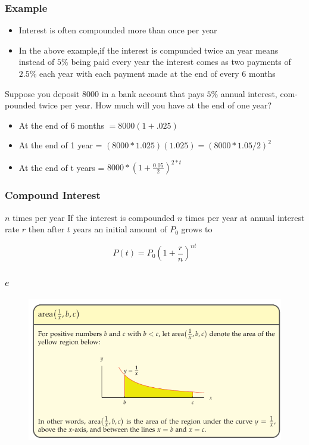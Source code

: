 \documentclass{beamer}
\begin{document}
    \begin{frame}
      \frametitle{Example}
\begin{itemize}
  \item Interest is often compounded more than once per year 
  \item In the above example,if the interest is compunded twice an year means instead of \(5\%\) being paid every year the interest comes as two payments of \(2.5\%\) each year with each payment made at the end of every 6 months
\end{itemize}
Suppose you deposit \(8000\) in a bank account that pays \(5\%\) annual interest, com-
pounded twice per year. How much will you have at the end of one year?

\pause 

\begin{itemize}
  \item At the end of 6 months \(= 8000(1+.025) \) 
  \item At the end of 1 year = \( (8000*1.025)(1.025) = (8000*1.05/2)^2 \)
  \item At the end of t years = \(8000*(1+\frac{0.05}{2})^{2*t} \)
\end{itemize}
\end{frame}
\begin{frame}
  \frametitle{Compound Interest}
  \begin{block}{\(n\) times per year}
    If the interest is compounded \(n\) times per year at annual interest rate
    \(r\) then after \(t\) years an initial amount of \(P_{0}\) grows to 

    \[P(t) = P_{0}(1+\frac{r}{n})^{nt}\]
    
  \end{block}
\end{frame}

\begin{frame}
  \frametitle{\( e \)}
  \begin{figure}
    \includegraphics[scale=0.5]{e_1.png}
  \end{figure}
\end{frame}
\end{document}
